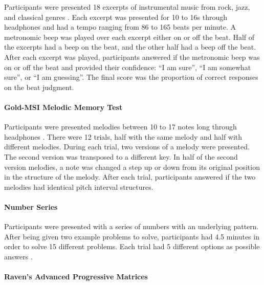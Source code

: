 \documentclass[]{book}
\let\oldparagraph\paragraph
\renewcommand{\paragraph}[1]{\oldparagraph{#1}\mbox{}}
\begin{document}
Participants were presented 18 excerpts of instrumental music from rock, jazz, and classical genres \citep{mullensiefenMusicalityNonMusiciansIndex2014}.
Each excerpt was presented for 10 to 16s through headphones and had a tempo ranging from 86 to 165 beats per
minute.
A metronomic beep was played over each excerpt either on or off the beat.
Half of the excerpts had a beep on the beat, and the other half had a beep off the beat.
After each excerpt was played, participants answered if the metronomic beep was on or off the beat and provided their confidence: ``I am sure'', ``I am somewhat sure'', or ``I am guessing''.
The final score was the proportion of correct responses on the beat judgment.

\hypertarget{gold-msi-melodic-memory-test}{%
\paragraph{Gold-MSI Melodic Memory Test}\label{gold-msi-melodic-memory-test}}

Participants were presented melodies between 10 to 17 notes long through headphones \citep{mullensiefenMusicalityNonMusiciansIndex2014}.
There were 12 trials, half with the same melody and half with different melodies.
During each trial, two versions of a melody were presented.
The second version was transposed to a different key.
In half of the second version melodies, a note was changed a step up or down from its original position in the structure of the melody.
After each trial, participants answered if the two melodies had identical pitch interval structures.

\hypertarget{number-series}{%
\paragraph{Number Series}\label{number-series}}

Participants were presented with a series of numbers with
an underlying pattern.
After being given two example problems to solve, participants had 4.5 minutes in order to solve 15 different problems.
Each trial had 5 different options as possible answers \citep{thurstonePrimaryMentalAbilities1938}.

\hypertarget{ravens-advanced-progressive-matrices}{%
\paragraph{Raven's Advanced Progressive Matrices}\label{ravens-advanced-progressive-matrices}}
\end{document}
